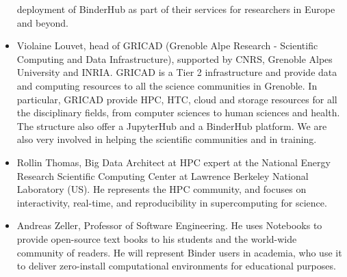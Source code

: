 \begin{itemize}
  deployment of BinderHub as part of their services for researchers in Europe
  and beyond.
\item Violaine Louvet, head of GRICAD (Grenoble Alpe Research -
 Scientific Computing and Data Infrastructure), supported by
 CNRS, Grenoble Alpes University and INRIA. GRICAD is a Tier 2
 infrastructure and provide data and computing resources to all the
 science communities in Grenoble. In particular, GRICAD provide HPC,
 HTC, cloud and storage resources for all the disciplinary fields,
 from computer sciences to human sciences and health. The structure
 also offer a JupyterHub and a BinderHub platform. We are also very
 involved in helping the scientific communities and in training.
 \item Rollin Thomas, Big Data Architect at HPC expert at the National Energy
  Research Scientific Computing Center at Lawrence Berkeley National Laboratory
  (US). He represents the HPC community, and focuses on interactivity,
  real-time, and reproducibility in supercomputing for science.
\item Andreas Zeller, Professor of Software Engineering. He uses Notebooks
  to provide open-source text books to his students and the world-wide
  community of readers. He will represent Binder users in academia, who use it
  to deliver zero-install computational environments for educational
  purposes.
\end{itemize}

